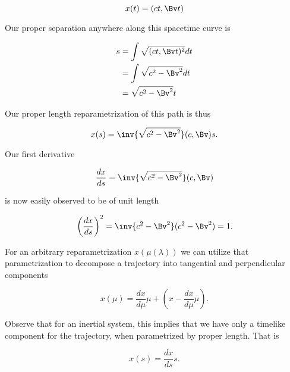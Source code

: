 \documentclass[iop,tighten]{emulateapj}
\begin{document}
\begin{equation}\label{eqn:grahamSchmidtLorentz:440}
x(t) = (c t, \Bv t)
\end{equation}

Our proper separation anywhere along this spacetime curve is

\begin{equation}\label{eqn:grahamSchmidtLorentz:460}
\begin{aligned}
s 
&= \int \sqrt{(c t, \Bv t)^2} dt  \\
&= \int \sqrt{ c^2 - \Bv^2 } dt  \\
&= \sqrt{ c^2 - \Bv^2 } t
\end{aligned}
\end{equation}

Our proper length reparametrization of this path is thus

\begin{equation}\label{eqn:grahamSchmidtLorentz:480}
x(s) = \inv{\sqrt{c^2 - \Bv^2}} (c, \Bv) s.
\end{equation}

Our first derivative

\begin{equation}\label{eqn:grahamSchmidtLorentz:500}
\frac{dx}{ds} = \inv{\sqrt{c^2 - \Bv^2}} (c, \Bv) 
\end{equation}

is now easily observed to be of unit length 

\begin{equation}\label{eqn:grahamSchmidtLorentz:520}
\left( \frac{dx}{ds} \right)^2 = \inv{c^2 - \Bv^2} (c^2 - \Bv^2) = 1.
\end{equation}

For an arbitrary reparametrization $x(\mu(\lambda))$ we can utilize that parametrization to decompose a trajectory into tangential and perpendicular components

\begin{equation}\label{eqn:grahamSchmidtLorentz:540}
x(\mu) = \frac{dx}{d\mu} \mu + \left( x - \frac{dx}{d\mu} \mu \right).
\end{equation}

Observe that for an inertial system, this implies that we have only a timelike component for the trajectory, when parametrized by proper length.  That is

\begin{equation}\label{eqn:grahamSchmidtLorentz:580}
x(s) = \frac{dx}{ds} s.
\end{equation}
\end{document}
